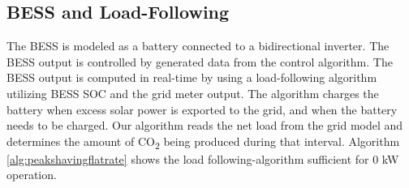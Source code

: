 \documentclass[conference]{IEEEtran}
\begin{document}
    \subsection{BESS and Load-Following}
    	The BESS is modeled as a battery connected to a bidirectional inverter. The BESS output is controlled by generated data from the control algorithm. The BESS output is computed in real-time by using a load-following algorithm utilizing  BESS SOC and the grid meter output. The algorithm charges the battery when excess solar power is exported to the grid, and when the battery needs to be charged. Our algorithm reads the net load from the grid  model and determines the amount of CO\textsubscript{2} being produced during that interval.  Algorithm \ref{alg:peakshavingflatrate} shows the load following-algorithm sufficient for 0 kW operation. 
\end{document}
